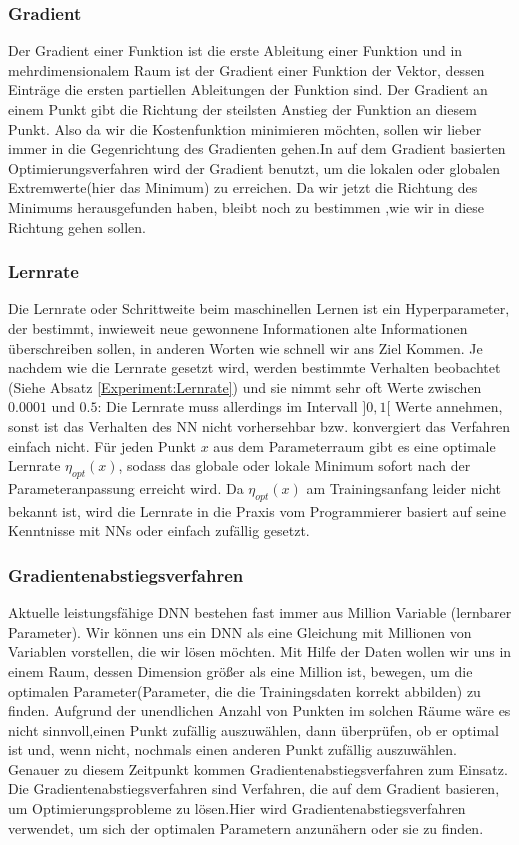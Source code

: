 \documentclass[12pt,a4paper]{scrartcl}
\numberwithin{equation}{section}
\begin{document}
\subsubsection{ Gradient}\label{Gradient}
Der Gradient einer Funktion ist die erste Ableitung einer Funktion und in mehrdimensionalem Raum ist der Gradient einer Funktion der Vektor, dessen Einträge  die ersten partiellen Ableitungen der Funktion sind. Der Gradient an einem Punkt gibt die Richtung der steilsten Anstieg der Funktion an diesem Punkt.  Also da wir die Kostenfunktion minimieren möchten, sollen wir lieber immer in die Gegenrichtung des Gradienten gehen.In auf dem Gradient basierten Optimierungsverfahren wird der Gradient benutzt, um die lokalen oder globalen Extremwerte(hier das Minimum) zu erreichen.
Da wir jetzt die Richtung des Minimums herausgefunden haben, bleibt noch zu bestimmen ,wie wir in diese Richtung gehen  sollen.

\subsubsection{Lernrate}\label{Lernrate}
Die Lernrate oder Schrittweite beim maschinellen Lernen ist ein Hyperparameter, der bestimmt, inwieweit neue gewonnene Informationen alte Informationen überschreiben sollen\cite{LearningRate}, in anderen Worten wie schnell wir ans Ziel Kommen.
Je nachdem wie die Lernrate gesetzt wird, werden bestimmte Verhalten beobachtet (Siehe Absatz \ref{Experiment:Lernrate}) und sie nimmt sehr oft Werte zwischen $ 0.0001 $ und $ 0.5 $:
Die Lernrate muss allerdings im Intervall  $]0,1[$ Werte annehmen, sonst ist das Verhalten des \ac{NN} nicht vorhersehbar bzw. konvergiert das Verfahren einfach nicht.
Für jeden Punkt $ x $ aus dem Parameterraum gibt es eine optimale Lernrate $ \eta_{opt}(x) $, sodass das globale oder lokale Minimum sofort nach der Parameteranpassung erreicht wird. Da $ \eta_{opt}(x) $ am Trainingsanfang leider nicht bekannt ist, wird die Lernrate in die Praxis vom Programmierer basiert auf seine Kenntnisse mit \acsp{NN} oder einfach zufällig gesetzt.

\subsubsection{Gradientenabstiegsverfahren}\label{Gradientenabstiegsverfahren}
Aktuelle leistungsfähige \ac{DNN} bestehen fast immer aus Million Variable (lernbarer Parameter). Wir können uns ein \ac{DNN} als eine Gleichung mit Millionen von Variablen vorstellen, die wir lösen möchten. Mit Hilfe der Daten wollen wir uns in einem Raum, dessen Dimension größer als eine Million ist, bewegen, um die optimalen Parameter(Parameter, die die Trainingsdaten korrekt abbilden) zu finden. Aufgrund der unendlichen Anzahl von Punkten im solchen Räume wäre es nicht sinnvoll,einen Punkt zufällig auszuwählen, dann überprüfen, ob er optimal ist und, wenn nicht, nochmals einen anderen Punkt zufällig auszuwählen. Genauer zu diesem Zeitpunkt kommen Gradientenabstiegsverfahren zum Einsatz.
Die Gradientenabstiegsverfahren sind Verfahren, die auf dem Gradient basieren, um Optimierungsprobleme zu lösen.Hier wird Gradientenabstiegsverfahren verwendet, um sich der optimalen Parametern anzunähern oder sie zu finden.
\end{document}
